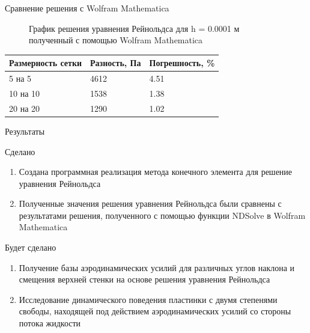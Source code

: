 \documentclass[ignoreonframetext,unicode]{beamer}
\begin{document}
\begin{frame}{Сравнение решения с Wolfram Mathematica}
	\vspace*{-4mm}
	\begin{figure}[!htbp]
		\caption{График решения уравнения Рейнольдса для h = 0.0001 м полученный с помощью Wolfram Mathematica}
		\label{exactSolutionConst}
	\end{figure}

\begin{table}[!htbp]
	\begin{tabular}{|l|l|l|}
		\hline
		\multicolumn{1}{|c|}{Размерность сетки} & \multicolumn{1}{c|}{Разность, Па} & Погрешность, \% \\ \hline
		5 на 5                                  & 4612                              & 4.51            \\ \hline
		10 на 10                                & 1538                              & 1.38            \\ \hline
		20 на 20                                & 1290                              & 1.02            \\ \hline
	\end{tabular}
\end{table}
\end{frame}

\begin{frame}{Результаты}
	\begin{block}{Сделано}
	\begin{enumerate}	
		\item Создана программная реализация метода конечного элемента для решение уравнения Рейнольдса
		\item Полученные значения решения уравнения Рейнольдса были сравнены с результатами решения, полученного с помощью функции NDSolve в Wolfram Mathematica
	\end{enumerate}
	\end{block}	

	\begin{block}{Будет сделано}
	\begin{enumerate}	
		\item Получение базы аэродинамических усилий  для различных углов наклона и смещения верхней стенки на основе решения уравнения Рейнольдса
		\item Исследование динамического поведения пластинки с двумя степенями свободы, находящей под действием аэродинамических усилий со стороны потока жидкости
	\end{enumerate}
\end{block}	
\end{frame}	
\end{document}
